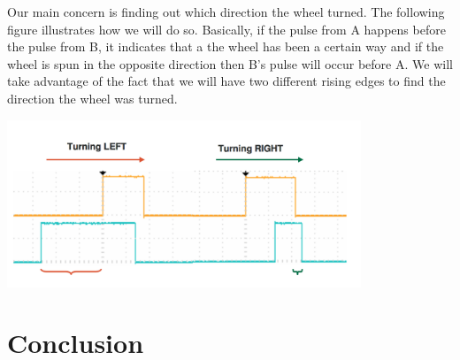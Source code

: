 \documentclass[11pt]{article}
\begin{document}
Our main concern is finding out which direction the wheel turned. The following figure illustrates how we will do so. Basically, if the pulse from A happens before the pulse from B, it indicates that a the wheel has been a certain way and if the wheel is spun in the opposite direction then B's pulse will occur before A. We will take advantage of the fact that we will have two different rising edges to find the direction the wheel was turned.

\begin{center}
\includegraphics[height=5cm]{images/lab2_fig6.png}
\end{center}

\section{Conclusion}
\end{document}
